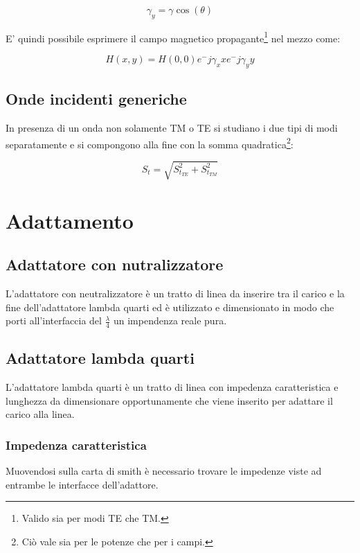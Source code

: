 \documentclass[10pt,a4paper]{report}
\begin{document}
			\begin{equation}
			\gamma_y=\gamma\cos(\theta)
			\end{equation}

			E' quindi possibile esprimere il campo magnetico propagante\footnote{Valido sia per modi TE che TM.} nel mezzo come:
			
			\begin{equation}
			H(x,y)=H(0,0)e^-{j\gamma_x x}e^-{j\gamma_y y}
			\end{equation}
		

		\section{Onde incidenti generiche}

		In presenza di un onda non solamente TM o TE si studiano i due tipi di modi separatamente e si compongono alla fine con la somma quadratica\footnote{Ciò vale sia per le potenze che per i campi.}:

		\begin{equation}
		S_{t}=\sqrt{S_{t_{TE}}^2 +S_{t_{TM}}^2 }
		\end{equation}

\chapter{Adattamento}

	\section{Adattatore con nutralizzatore}

		L'adattatore con neutralizzatore è un tratto di linea da inserire tra il carico e la fine dell'adattatore lambda quarti ed è utilizzato e dimensionato in modo che porti all'interfaccia del $\frac{\lambda}{4}$ un impendenza reale pura.

	\section{Adattatore lambda quarti}
		
		L'adattatore lambda quarti è un tratto di linea con impedenza caratteristica e lunghezza da dimensionare opportunamente che viene inserito per adattare il carico alla linea.

		\subsection{Impedenza caratteristica}
				Muovendosi sulla carta di smith è necessario trovare le impedenze viste ad entrambe le interfacce dell'adattore.
\end{document}

